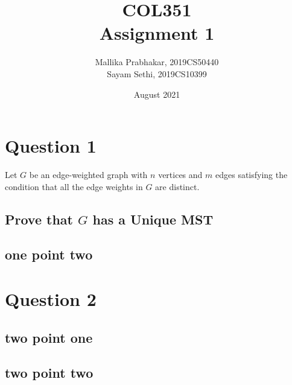 \documentclass[12pt]{article}
\title{COL351 \\ Assignment 1}
\author{Mallika Prabhakar, 2019CS50440 \\ Sayam Sethi, 2019CS10399}
\date{August 2021}
\begin{document}

\maketitle
\tableofcontents
{}


\section{Question 1}

Let $G$ be an edge-weighted graph with $n$ vertices and $m$ edges satisfying the condition that all the edge weights in $G$ are distinct.

\subsection{Prove that $G$ has a Unique MST}



\subsection{one point two}


\section{Question 2}


\subsection{two point one}


\subsection{two point two}
\end{document}
